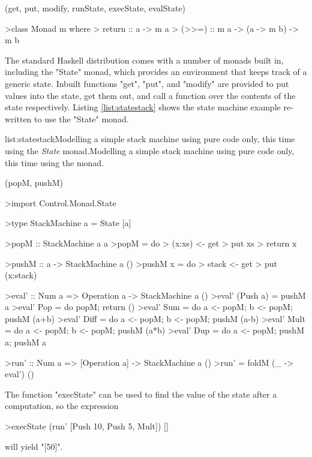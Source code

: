 \functions(get, put, modify, runState, execState, evalState)
\begin{haskell}

>class Monad m where
>  return :: a -> m a
>  (>>=) :: m a -> (a -> m b) -> m b

\end{haskell}
\noindent 
The standard Haskell distribution comes with a number of monads built in, including the "State" monad, which provides an environment that keeps track of a generic state. Inbuilt functions "get", "put", and "modify" are provided to put values into the state, get them out, and call a function over the contents of the state respectively. Listing \ref{list:statestack} shows the state machine example re-written to use the "State" monad.

\vspace{-0.5em}
\begin{listing}{list:statestack}{Modelling a simple stack machine using pure code only, this time using the \emph{State} monad.}{Modelling a simple stack machine using pure code only, this time using the  monad.}{}
\end{listing}\vspace{-1.5em}

\functions(popM, pushM)
\begin{haskell}

>import Control.Monad.State

>type StackMachine a = State [a]

>popM :: StackMachine a a
>popM = do
>  (x:xs) <- get
>  put xs
>  return x

>pushM :: a -> StackMachine a ()
>pushM x = do
>  stack <- get
>  put (x:stack)

>eval' :: Num a => Operation a -> StackMachine a ()
>eval' (Push a) = pushM a
>eval' Pop  = do popM; return ()
>eval' Sum  = do a <- popM; b <- popM; pushM (a+b)
>eval' Diff = do a <- popM; b <- popM; pushM (a-b)
>eval' Mult = do a <- popM; b <- popM; pushM (a*b)
>eval' Dup  = do a <- popM; pushM a; pushM a

>run' :: Num a => [Operation a] -> StackMachine a ()
>run' = foldM (\_ -> eval') ()

\end{haskell}
\noindent The function "execState" can be used to find the value of the state after a computation, so the expression

\begin{haskell}

>execState (run' [Push 10, Push 5, Mult]) []

\end{haskell}
\noindent will yield "[50]".

